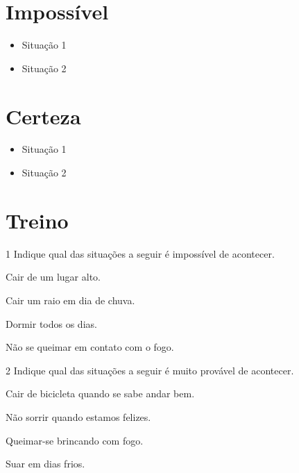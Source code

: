 \section*{Impossível}

\begin{itemize}
\item Situação 1
\end{itemize}

\begin{itemize}
\item Situação 2
\end{itemize}

\section*{Certeza}

\begin{itemize}
\item Situação 1
\end{itemize}

\begin{itemize}
\item Situação 2
\end{itemize}

\section*{Treino}

\num{1} Indique qual das situações a seguir é impossível de acontecer.

\begin{escolha}[itemsep=-5pt]
\item Cair de um lugar alto.

\item Cair um raio em dia de chuva.

\item Dormir todos os dias.

\item Não se queimar em contato com o fogo.
\end{escolha}

\num{2} Indique qual das situações a seguir é muito provável de acontecer.

\begin{escolha}[itemsep=-5pt]
\item Cair de bicicleta quando se sabe andar bem.

\item Não sorrir quando estamos felizes.

\item Queimar-se brincando com fogo.

\item Suar em dias frios.
\end{escolha}


